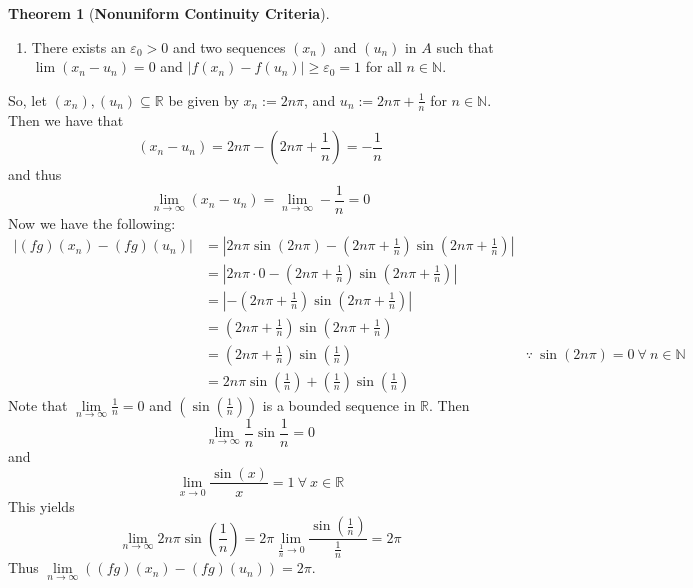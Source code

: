 \documentclass[12pt,letterpaper]{article}
\newcommand{\abs}[1]{\left\lvert #1 \right\rvert}
\newcommand{\R}{\mathbb{R}}
\newcommand{\N}{\mathbb{N}}
\theoremstyle{case}
\theoremstyle{definition}
\newtheorem*{theorem*}{Theorem}
\begin{document}
\begin{enumerate}
\begin{enumerate}
\begin{theorem*}[\textbf{Nonuniform Continuity Criteria}]
\begin{enumerate}
					\item There exists an $\varepsilon_0 > 0$ and two sequences $(x_n)$ and $(u_n)$ in $A$ such that $\lim (x_n - u_n)=0$ and $|f(x_n)-f(u_n)|\geq \varepsilon_0=1$ for all $n \in \N$.
				\end{enumerate}
			\end{theorem*}
			So, let $(x_n), (u_n) \subseteq \R$ be given by $x_n:=2n\pi$, and $u_n:=2n\pi + \frac{1}{n}$ for $n \in \N$. Then we have that 
			\[(x_n-u_n)=2n\pi - (2n\pi + \frac{1}{n})=-\frac{1}{n}\]
			and thus
			\[\lim\limits_{n \to \infty} (x_n-u_n)=\lim\limits_{n \to \infty} -\frac{1}{n} = 0\]
			Now we have the following:
			\begin{align*}
				|(fg)(x_n) - (fg)(u_n)| &= \abs{2n\pi \sin (2n\pi) - \left(2n\pi+\frac{1}{n}\right)\sin \left(2n\pi + \frac{1}{n}\right)} \\
				&=\abs{2n\pi \cdot 0 - \left(2n\pi + \frac{1}{n}\right) \sin \left(2n\pi + \frac{1}{n}\right)} \\
				&=\abs{-\left(2n\pi + \frac{1}{n}\right) \sin \left(2n\pi + \frac{1}{n}\right)} \\
				&= \left(2n\pi + \frac{1}{n}\right) \sin \left(2n\pi + \frac{1}{n}\right) \\
				&= \left(2n\pi + \frac{1}{n}\right) \sin \left(\frac{1}{n}\right) & \because\ \sin(2n\pi) = 0\ \forall\ n \in \N \\
				&= 2n\pi \sin \left(\frac{1}{n}\right) + \left(\frac{1}{n}\right) \sin \left(\frac{1}{n}\right)
			\end{align*}
			Note that $\lim\limits_{n \to \infty} \frac{1}{n}=0$ and $\left(\sin \left(\frac{1}{n}\right)\right)$ is a bounded sequence in $\R$. Then
			\[\lim\limits_{n \to \infty} \frac{1}{n} \sin \frac{1}{n} = 0\]
			and
			\[\lim\limits_{x \to 0} \frac{\sin (x)}{x}=1\ \forall\ x \in \R\]
			This yields
			\[\lim\limits_{n \to \infty} 2n\pi \sin \left(\frac{1}{n}\right) = 2\pi \lim\limits_{\frac{1}{n} \to 0} \frac{\sin \left(\frac{1}{n}\right)}{\frac{1}{n}}=2\pi\]
			Thus $\lim\limits_{n \to \infty} ((fg)(x_n) - (fg)(u_n)) = 2\pi$.\\
			

\end{enumerate}
\end{enumerate}
\end{document}
